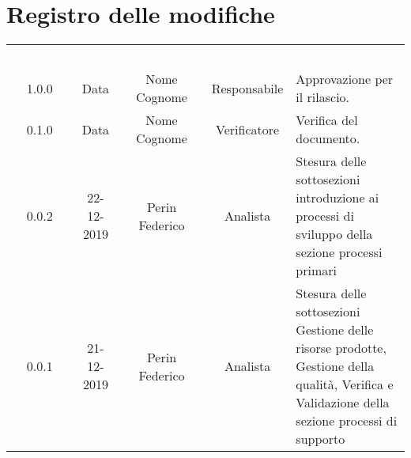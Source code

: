 \section*{Registro delle modifiche}
{
\renewcommand{\arraystretch}{1.5}
\centering
\begin{longtable}{ c c  c  c C{4cm}}
\textcolor{white}{\textbf{Versione}} & \textcolor{white}{\textbf{Data}} & \textcolor{white}{\textbf{Nominativo}} & \textcolor{white}{\textbf{Ruolo}} & \textcolor{white}{\textbf{Descrizione}}\\	


1.0.0 & Data & Nome Cognome & Responsabile & Approvazione per il rilascio.  \\
		
0.1.0 & Data & Nome Cognome & Verificatore & Verifica del documento.  \\

0.0.2 & 22-12-2019 & Perin Federico & Analista & Stesura delle sottosezioni introduzione ai processi di sviluppo della sezione processi primari\\
		
0.0.1 & 21-12-2019 & Perin Federico & Analista & Stesura delle sottosezioni Gestione delle risorse prodotte, Gestione della qualità, Verifica e Validazione della sezione processi di supporto \\
		
		
\end{longtable}
}